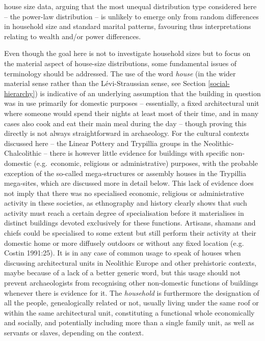 \documentclass[
  12pt,
]{book}
\begin{document}
house size data, arguing that the most unequal distribution type considered here -- the power-law distribution -- is unlikely to emerge only from random differences in household size and standard marital patterns, favouring thus interpretations relating to wealth and/or power differences.

Even though the goal here is not to investigate household sizes but to focus on the material aspect of house-size distributions, some fundamental issues of terminology should be addressed. The use of the word \emph{house} (in the wider material sense rather than the Lévi-Straussian sense, see Section \ref{social-hierarchy}) is indicative of an underlying assumption that the building in question was in use primarily for domestic purposes -- essentially, a fixed architectural unit where someone would spend their nights at least most of their time, and in many cases also cook and eat their main meal during the day -- though proving this directly is not always straightforward in archaeology. For the cultural contexts discussed here -- the Linear Pottery and Trypillia groups in the Neolithic-Chalcolithic -- there is however little evidence for buildings with specific non-domestic (e.g.~economic, religious or administrative) purposes, with the probable exception of the so-called mega-structures or assembly houses in the Trypillia mega-sites, which are discussed more in detail below. This lack of evidence does not imply that there was no specialised economic, religious or administrative activity in these societies, as ethnography and history clearly shows that such activity must reach a certain degree of specialisation before it materialises in distinct buildings devoted exclusively for these functions. Artisans, shamans and chiefs could be specialised to some extent but still perform their activity at their domestic home or more diffusely outdoors or without any fixed location (e.g. Costin 1991:25). It is in any case of common usage to speak of houses when discussing architectural units in Neolithic Europe and other prehistoric contexts, maybe because of a lack of a better generic word, but this usage should not prevent archaeologists from recognising other non-domestic functions of buildings whenever there is evidence for it. The \emph{household} is furthermore the designation of all the people, genealogically related or not, usually living under the same roof or within the same architectural unit, constituting a functional whole economically and socially, and potentially including more than a single family unit, as well as servants or slaves, depending on the context.
\end{document}
